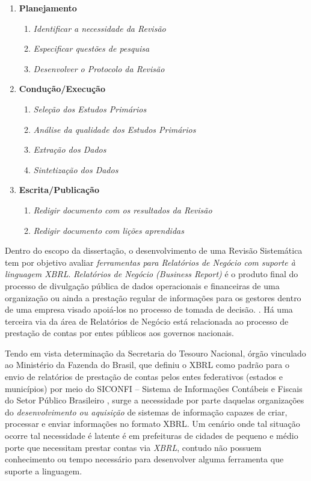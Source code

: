 \documentclass[msc,proposal,hidelot,hideabstract]{ppgccufmg} %
\begin{document}
\begin{enumerate}
  \item \textbf{Planejamento}
  \begin{enumerate}
    \item \textit{Identificar a necessidade da Revisão}
    \item \textit{Especificar questões de pesquisa}
    \item \textit{Desenvolver o Protocolo da Revisão}
  \end{enumerate}
  \item \textbf{Condução/Execução}
  \begin{enumerate}
    \item \textit{Seleção dos Estudos Primários}
    \item \textit{Análise da qualidade dos Estudos Primários}
     \item \textit{Extração dos Dados}
     \item \textit{Sintetização dos Dados}
   \end{enumerate}
  \item \textbf{Escrita/Publicação}
  \begin{enumerate}
    \item \textit{Redigir documento com os resultados da Revisão}
    \item \textit{Redigir documento com lições aprendidas}
  \end{enumerate}
\end{enumerate}


Dentro do escopo da dissertação, o desenvolvimento de uma Revisão Sistemática
tem por objetivo avaliar \textit{ferramentas para Relatórios de Negócio com suporte à linguagem XBRL}. \textit{Relatórios  de Negócio (Business Report)} é o produto final do  processo de divulgação pública de dados operacionais e financeiras de uma organização ou ainda a prestação regular de informações para os gestores dentro de uma empresa visado apoiá-los no processo de tomada de decisão.
\cite{lymer1999business}. Há uma terceira via da área de  Relatórios de Negócio está relacionada ao processo de prestação de contas por entes públicos aos governos nacionais.

Tendo em vista determinação da Secretaria do Tesouro Nacional, órgão
vinculado ao  Ministério da Fazenda do Brasil, que definiu o XBRL como
padrão para o envio de relatórios de prestação de contas pelos entes
federativos (estados e municípios) por meio do SICONFI – Sistema de Informações Contábeis e Fiscais do Setor Público Brasileiro \cite{nt_03_2013}, surge a necessidade por parte
daquelas organizações do \textit{desenvolvimento ou aquisição} de sistemas de
informação capazes de criar, processar e enviar informações no formato
XBRL. Um cenário onde tal situação ocorre tal necessidade é latente é em prefeituras de cidades de pequeno e médio porte que necessitam prestar contas via \textit{XBRL}, contudo
não possuem conhecimento ou tempo necessário para desenvolver alguma ferramenta que suporte a linguagem.
\end{document}
